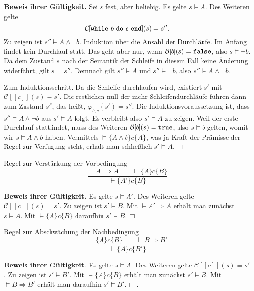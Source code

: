 \documentclass[8pt,fleqn,aspectratio=169]{beamer}
\newcommand{\strong}[1]{\textsf{\textbf{#1}}}
\renewcommand{\qedsymbol}{\ensuremath{\Box}}
\newcommand{\parspace}{\vspace{0.8em}}
\newcommand{\kw}[1]{\textbf{\texttt{#1}}}
\newcommand{\qb}[1]{[\!\![#1]\!\!]}
\newcommand{\evB}{\mathcal B}
\newcommand{\evC}{\mathcal C}
\begin{document}
\begin{frame}
\strong{Beweis ihrer Gültigkeit.} Sei $s$ fest, aber beliebig.
Es gelte $s\models A$. Des Weiteren gelte
\[\evC\qb{\text{\kw{while} $b$ \kw{do} $c$ \kw{end}}}(s) = s''.\]
Zu zeigen ist $s''\models A\land\lnot b$.\pause{} Induktion über die
Anzahl der Durchläufe. Im Anfang findet kein Durchlauf statt. Das
geht aber nur, wenn $\evB\qb{b}(s)=\kw{false}$, also $s\models\lnot b$.
Da dem Zustand $s$ nach der Semantik der Schleife in diesem Fall keine Änderung
widerfährt, gilt $s=s''$. Demnach gilt $s''\models A$ und $s''\models\lnot b$,
also $s''\models A\land\lnot b$.\pause

\parspace
Zum Induktionsschritt. Da die Schleife durchlaufen wird, existiert
$s'$ mit $\evC\qb{c}(s)=s'$. Die restlichen null der mehr Schleifendurchläufe
führen dann zum Zustand $s''$, das heißt, $\varphi_{b,c}(s')=s''$.
Die Induktionsvoraussetzung ist, dass $s''\models A\land\lnot b$
aus $s'\models A$ folgt. Es verbleibt also $s'\models A$ zu zeigen.
Weil der erste Durchlauf stattfindet, muss des Weiteren $\evB\qb{b}(s)=\kw{true}$,
also $s\models b$ gelten, womit wir $s\models A\land b$ haben.
Vermittels $\models\{A\land b\}c\{A\}$, was ja Kraft der Prämisse der Regel
zur Verfügung steht, erhält man schließlich $s'\models A$.\,\qedsymbol
\end{frame}

\begin{frame}
\begin{block}{Regel zur Verstärkung der Vorbedingung}
\[\dfrac{\vdash A'\Rightarrow A\qquad\vdash\{A\}c\{B\}}{
\vdash\{A'\}c\{B\}}\]
\end{block}\pause
\strong{Beweis ihrer Gültigkeit.} Es gelte $s\models A'$.
Des Weiteren gelte $\evC\qb{c}(s)=s'$. Zu zeigen ist $s'\models B$.\pause{}
Mit $\models A'\Rightarrow A$ erhält man zunächst $s\models A$.
Mit $\models\{A\}c\{B\}$ daraufhin $s'\models B$.\,\qedsymbol
\end{frame}

\begin{frame}
\begin{block}{Regel zur Abschwächung der Nachbedingung}
\[\dfrac{\vdash\{A\}c\{B\}\qquad\vdash B\Rightarrow B'}{
\vdash\{A\}c\{B'\}}\]
\end{block}\pause
\strong{Beweis ihrer Gültigkeit.} Es gelte $s\models A$.
Des Weiteren gelte $\evC\qb{c}(s)=s'$. Zu zeigen ist $s'\models B'$.\pause{}
Mit $\models\{A\}c\{B\}$ erhält man zunächst $s'\models B$. Mit
$\models B\Rightarrow B'$ erhält man daraufhin $s'\models B'$.\,\qedsymbol.
\end{frame}
\end{document}
